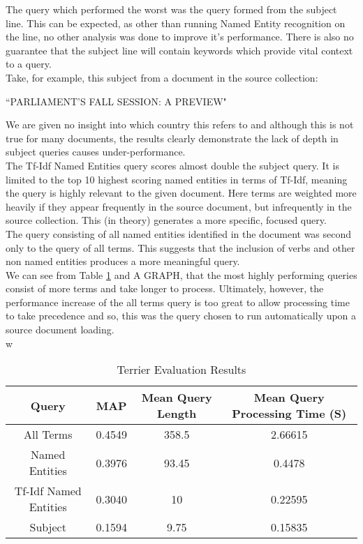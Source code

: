 \documentclass{l4proj}
\begin{document}
The query which performed the worst was the query formed from the subject line. This can be expected, as other than running Named Entity recognition on the line, no other analysis was done to improve it's performance. There is also no guarantee that the subject line will contain keywords which provide vital context to a query.\\
Take, for example, this subject from a document in the source collection:
\begin{center}
``PARLIAMENT'S FALL SESSION: A PREVIEW"
\end{center}
We are given no insight into which country this refers to and although this is not true for many documents, the results clearly demonstrate the lack of depth in subject queries causes under-performance.\\
The Tf-Idf Named Entities query scores almost double the subject query. It is limited to the top 10 highest scoring named entities in terms of Tf-Idf, meaning the query is highly relevant to the given document. Here terms are weighted more heavily if they appear frequently in the source document, but infrequently in the source collection. This (in theory) generates a more specific, focused query. \\
The query consisting of all named entities identified in the document was second only to the query of all terms. This suggests that the inclusion of verbs and other non named entities produces a more meaningful query.\\
We can see from Table \ref{results} and A GRAPH, that the most highly performing queries consist of more terms and take longer to process. Ultimately, however, the performance increase of the all terms query is too great to allow processing time to take precedence and so, this was the query chosen to run automatically upon a source document loading.\\w
\begin{center}
\begin{table}
\centering
\begin{tabular}{|c|c|c|c|}
\hline
Query                 & MAP    & Mean Query Length & Mean Query Processing Time (S) \\ \hline
All Terms             & 0.4549 & 358.5             & 2.66615                        \\ \hline
Named Entities        & 0.3976 & 93.45             & 0.4478                         \\ \hline
Tf-Idf Named Entities & 0.3040 & 10                & 0.22595                        \\ \hline
Subject               & 0.1594 & 9.75              & 0.15835                        \\ \hline
\end{tabular}
\caption{Terrier Evaluation Results}
\label{results}
\end{table}
\end{center}
\end{document}
